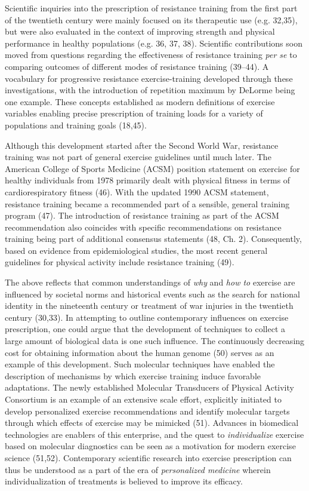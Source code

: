 \documentclass[twoside,10pt]{gihclass} %
\begin{document}
Scientific inquiries into the prescription of resistance training from the first part of the twentieth century were mainly focused on its therapeutic use
(e.g. 32,35),
but were also evaluated in the context of improving strength and physical performance in healthy populations
(e.g. 36, 37, 38).
Scientific contributions soon moved from questions regarding the effectiveness of resistance training \emph{per se} to comparing outcomes of different modes of resistance training
(39--44).
A vocabulary for progressive resistance exercise-training developed through these investigations, with
the introduction of repetition maximum by DeLorme being one example. These concepts established as modern definitions of exercise variables enabling precise prescription of training loads for a variety of populations and training goals
(18,45).

Although this development started after the Second World War, resistance training was not part of general exercise guidelines until much later.
The American College of Sports Medicine (ACSM) position statement on exercise for healthy individuals from 1978 primarily dealt with physical fitness in terms of cardiorespiratory fitness
(46).
With the updated 1990 ACSM statement, resistance training became a recommended part of a sensible, general training program
(47).
The introduction of resistance training as part of the ACSM recommendation also coincides with specific recommendations on resistance training being part of additional consensus statements
(48, Ch. 2).
Consequently, based on evidence from epidemiological studies, the most recent general guidelines for physical activity include resistance training (49).

The above reflects that common understandings of \emph{why} and \emph{how to} exercise are influenced by societal norms and historical events such as the search for national identity in the nineteenth century or treatment of war injuries in the twentieth century
(30,33).
In attempting to outline contemporary influences on exercise prescription, one could argue that the development of techniques to collect a large amount of biological data is one such influence. The continuously decreasing cost for obtaining information about the human genome
(50) serves as an example of this development.
Such molecular techniques have enabled the description of mechanisms by which exercise training induce favorable adaptations. The newly established Molecular Transducers of Physical Activity Consortium is an example of an extensive scale effort, explicitly initiated to develop personalized exercise recommendations and identify molecular targets through which effects of exercise may be mimicked
(51).
Advances in biomedical technologies are enablers of this enterprise, and the quest to \emph{individualize} exercise based on molecular diagnostics can be seen as a motivation for modern exercise science
(51,52).
Contemporary scientific research into exercise prescription can thus be understood as a part of the era of \emph{personalized medicine} wherein individualization of treatments is believed to improve its efficacy.
\end{document}
